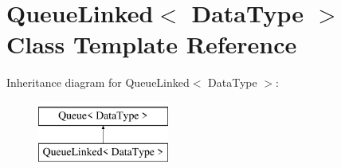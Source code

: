 \hypertarget{class_queue_linked}{\section{Queue\+Linked$<$ Data\+Type $>$ Class Template Reference}
\label{class_queue_linked}
}
Inheritance diagram for Queue\+Linked$<$ Data\+Type $>$\+:\begin{figure}[H]
\begin{center}
\leavevmode
\includegraphics[height=2.000000cm]{class_queue_linked}
\end{center}
\end{figure}
